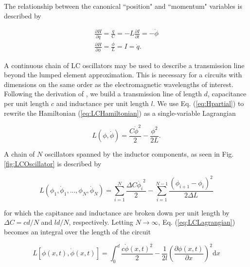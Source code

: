 \documentclass[11 pt, oneside]{book} %
\begin{document}
The relationship between the canonical ``position" and ``momentum" variables is described by 

\begin{eqnarray}
\frac{\partial H}{\partial q}=\frac{q}{C}=-L\frac{\partial I}{\partial t}=-\dot{\phi} \label{eq:Hpartial}\\
\frac{\partial H}{\partial \phi}=\frac{\phi}{L}=I=\dot{q}.
\end{eqnarray}

A continuous chain of LC oscillators may be used to describe a transmission line beyond the lumped element approximation\cite{Pozar}. This is necessary for a circuits with dimensions on the same order as the electromagnetic wavelengths of interest. Following the derivation of \cite{Bishop}, we build a transmission line of length $d$, capacitance per unit length $c$ and inductance per unit length $l$. We use Eq. (\ref{eq:Hpartial}) to rewrite the Hamiltonian (\ref{eq:LCHamiltonian}) as a single-variable Lagrangian

\begin{equation}
L(\phi, \dot{\phi})=\frac{C\dot{\phi}^2}{2}-\frac{\phi^2}{2L}.
\end{equation}


A chain of $N$ oscillators spanned by the inductor components, as seen in Fig. \ref{fig:LCOscillator} is described by  %

\begin{equation}\label{eq:LCLagrangian}
L(\phi_1, \dot{\phi}_1,...,\phi_N, \dot{\phi}_N)=
\sum_{i=1}^N \frac{\Delta C \dot{\phi_i}^2}{2} -
\sum_{i=1}^{N-1}\frac{(\phi_{i+1}-\phi_i)^2}{2\Delta L}
\end{equation}

for which the capitance and inductance are broken down per unit length by $\Delta C=cd/N$ and $ld/N$, respectively. Letting $N\rightarrow \infty$, Eq. (\ref{eq:LCLagrangian}) becomes an integral over the length of the circuit

\begin{equation}\label{eq:LCLagrangianIntegral}
L[\phi(x,t),\dot{\phi}(x,t)]=
\int_0^d\frac{c\dot{\phi}(x,t)^2}{2}-\frac{1}{2l}\left(\frac{\partial\phi(x,t)}{\partial x}\right)^2\mathrm{d}x
\end{equation}
\end{document}
